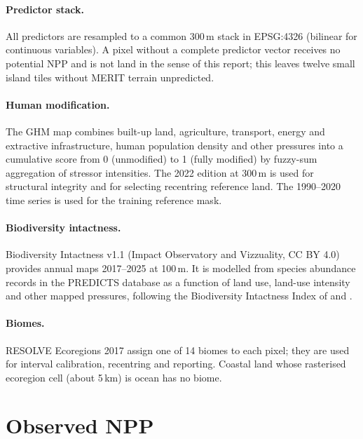 \documentclass[11pt,a4paper]{article}
\begin{document}
\paragraph{Predictor stack.} All predictors are resampled to a common 300\,m stack in
EPSG:4326 (bilinear for continuous variables). A pixel without a complete predictor vector
receives no potential NPP and is not land in the sense of this report; this leaves twelve small
island tiles without MERIT terrain unpredicted.

\paragraph{Human modification.} The GHM map \citep{theobald2020,kennedy2019} combines
built-up land, agriculture, transport, energy and extractive infrastructure, human population
density and other pressures into a cumulative score from 0 (unmodified) to 1 (fully modified)
by fuzzy-sum aggregation of stressor intensities. The 2022 edition at 300\,m
\citep{theobald2024} is used for structural integrity and for selecting recentring reference
land. The 1990--2020 time series \citep{theobald2024ts} is used for the training reference
mask.

\paragraph{Biodiversity intactness.} Biodiversity Intactness v1.1 (Impact Observatory and
Vizzuality, CC BY 4.0) provides annual maps 2017--2025 at 100\,m. It is modelled from species
abundance records in the PREDICTS database \citep{hudson2017} as a function of land use,
land-use intensity and other mapped pressures, following the Biodiversity Intactness Index of
\citet{scholes2005} and \citet{newbold2016}.

\paragraph{Biomes.} RESOLVE Ecoregions 2017 assign one of 14 biomes to each pixel; they are
used for interval calibration, recentring and reporting. Coastal land whose rasterised
ecoregion cell (about 5\,km) is ocean has no biome.

\section{Observed NPP}
\label{sec:observed}
\end{document}
